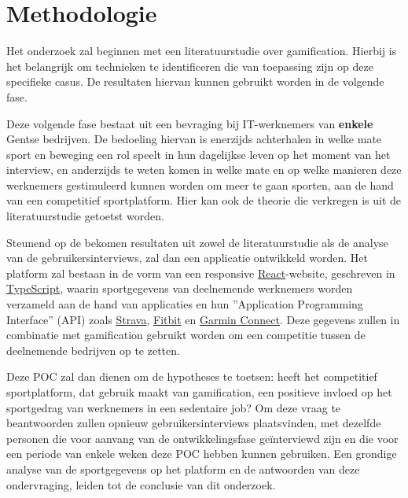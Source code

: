 \section{Methodologie}%
\label{sec:methodologie}

Het onderzoek zal beginnen met een literatuurstudie over gamification. Hierbij is het belangrijk om technieken te identificeren die van toepassing zijn op deze specifieke casus. De resultaten hiervan kunnen gebruikt worden in de volgende fase.

Deze volgende fase bestaat uit een bevraging bij IT-werknemers van \textbf{enkele} Gentse bedrijven. De bedoeling hiervan is enerzijds achterhalen in welke mate sport en beweging een rol speelt in hun dagelijkse leven op het moment van het interview, en anderzijds te weten komen in welke mate en op welke manieren deze werknemers gestimuleerd kunnen worden om meer te gaan sporten, aan de hand van een competitief sportplatform. Hier kan ook de theorie die verkregen is uit de literatuurstudie getoetst worden.

Steunend op de bekomen resultaten uit zowel de literatuurstudie als de analyse van de gebruikersinterviews, zal dan een applicatie ontwikkeld worden. Het platform zal bestaan in de vorm van een responsive \href{https://react.dev/}{React}-website, geschreven in \href{https://www.typescriptlang.org/}{TypeScript}, waarin sportgegevens van deelnemende werknemers worden verzameld aan de hand van applicaties en hun ''Application Programming Interface'' (API) zoals \href{https://developers.strava.com/}{Strava}, \href{https://dev.fitbit.com/}{Fitbit} en \href{https://developer.garmin.com/gc-developer-program/overview/}{Garmin Connect}. Deze gegevens zullen in combinatie met gamification gebruikt worden om een competitie tussen de deelnemende bedrijven op te zetten.

Deze POC zal dan dienen om de hypotheses te toetsen: heeft het competitief sportplatform, dat gebruik maakt van gamification, een positieve invloed op het sportgedrag van werknemers in een sedentaire job? Om deze vraag te beantwoorden zullen opnieuw gebruikersinterviews plaatsvinden, met dezelfde personen die voor aanvang van de ontwikkelingsfase geïnterviewd zijn en die voor een periode van enkele weken deze POC hebben kunnen gebruiken. Een grondige analyse van de sportgegevens op het platform en de antwoorden van deze ondervraging, leiden tot de conclusie van dit onderzoek.

